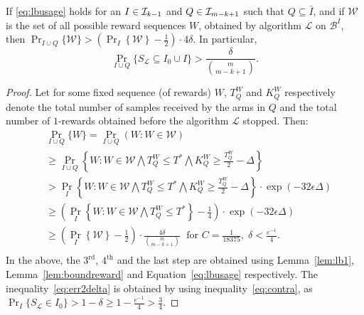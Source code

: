 \begin{lemma}\label{lem:boundallreward}
  If \eqref{eq:lbusage} holds for an $I \in \mathcal{I}_{k-1}$ and $Q \in \mathcal{I}_{m-k+1}$ such that $Q \subseteq \bar{I}$,
  and if $\mathcal{W}$ is the set of all
 possible reward sequences $W$, obtained by algorithm $\mathcal{L}$ on $\mathcal{B}^{I}$, then $\Pr_{I \cup Q}\{\mathcal{W}\} > \left(\Pr_{I}\left\{\mathcal{W}\right\}-\frac{1}{2}\right)\cdot 4\delta.$
   In particular,
   \begin{equation}\label{eq:err2delta}
    \Pr_{I \cup Q}\{S_\mathcal{L} \subseteq I_0 \cup I\} > \frac{\delta}{\binom{m}{m-k+1}}.
   \end{equation}

\end{lemma}
\begin{proof}
Let for some fixed sequence (of rewards) $W$, $T_{Q}^W$ and $ K_{Q}^W $ respectively
denote the total number of samples received by the arms in $Q$ and the total number of $1$-rewards obtained before the algorithm $\mathcal{L}$ stopped.
Then:
\begin{align*}
 &\Pr_{I \cup Q}\{W\}  = \Pr_{I \cup Q}(W : W \in \mathcal{W}) \nonumber\\
& \geq  \Pr_{I \cup Q}\left\{W : W \in \mathcal{W} \bigwedge T_{Q}^W \leq T^* \bigwedge  K_{Q}^W \geq \frac{T_{Q}^W}{2} - \Delta\right\}\\
& >  \Pr_{I}\left\{W : W \in \mathcal{W} \bigwedge T_{Q}^W \leq T^* \bigwedge  K_{Q}^W \geq \frac{T_{Q}^W}{2} - \Delta\right\}\cdot \exp(-32\epsilon\Delta)\\
& \geq \left(\Pr_{I}\left\{W : W \in \mathcal{W} \bigwedge T_{Q}^W \leq T^*\right\}-\frac{1}{4}\right)\cdot \exp(-32\epsilon\Delta)\\
& \geq  \left(\Pr_{I}\left\{\mathcal{W}\right\}-\frac{1}{2}\right)\cdot \frac{4\delta}{\binom{m}{m-k+1}}\; \text{ for } C = \frac{1}{18375},\; \delta < \frac{e^{-1}}{4} .\\
\end{align*}
 In the above, the $3^\text{rd}$, $4^\text{th}$ and the last step are obtained using Lemma~\ref{lem:lb1}, Lemma~\ref{lem:boundreward} and Equation~\eqref{eq:lbusage}  respectively.
The inequality~\eqref{eq:err2delta} is obtained by using inequality~\eqref{eq:contra},
as $\Pr_{I}\{S_\mathcal{L} \in I_0 \} > 1 - \delta \geq 1 - \frac{e^{-1}}{4} > \frac{3}{4}$.
\end{proof}
